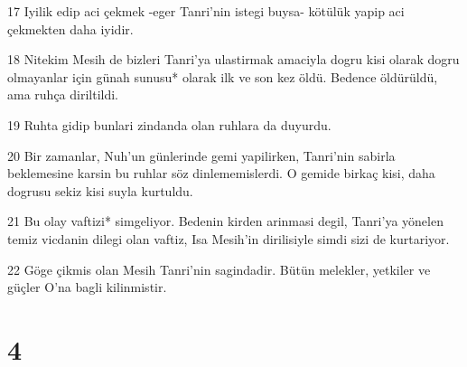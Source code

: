 \par 17 Iyilik edip aci çekmek -eger Tanri'nin istegi buysa- kötülük yapip aci çekmekten daha iyidir.
\par 18 Nitekim Mesih de bizleri Tanri'ya ulastirmak amaciyla dogru kisi olarak dogru olmayanlar için günah sunusu* olarak ilk ve son kez öldü. Bedence öldürüldü, ama ruhça diriltildi.
\par 19 Ruhta gidip bunlari zindanda olan ruhlara da duyurdu.
\par 20 Bir zamanlar, Nuh'un günlerinde gemi yapilirken, Tanri'nin sabirla beklemesine karsin bu ruhlar söz dinlememislerdi. O gemide birkaç kisi, daha dogrusu sekiz kisi suyla kurtuldu.
\par 21 Bu olay vaftizi* simgeliyor. Bedenin kirden arinmasi degil, Tanri'ya yönelen temiz vicdanin dilegi olan vaftiz, Isa Mesih'in dirilisiyle simdi sizi de kurtariyor.
\par 22 Göge çikmis olan Mesih Tanri'nin sagindadir. Bütün melekler, yetkiler ve güçler O'na bagli kilinmistir.

\chapter{4}

